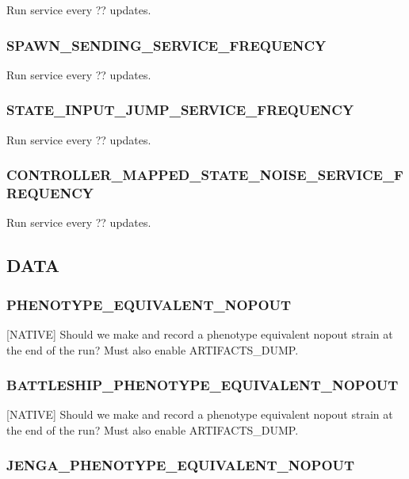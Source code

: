 
Run service every ?? updates.

\subsubsection{SPAWN\_SENDING\_SERVICE\_FREQUENCY}


Run service every ?? updates.

\subsubsection{STATE\_INPUT\_JUMP\_SERVICE\_FREQUENCY}


Run service every ?? updates.

\subsubsection{CONTROLLER\_MAPPED\_STATE\_NOISE\_SERVICE\_FREQUENCY}


Run service every ?? updates.

\subsection{DATA}

\subsubsection{PHENOTYPE\_EQUIVALENT\_NOPOUT}


[NATIVE] Should we make and record a phenotype equivalent nopout strain at the end of the run? Must also enable ARTIFACTS\_DUMP.

\subsubsection{BATTLESHIP\_PHENOTYPE\_EQUIVALENT\_NOPOUT}


[NATIVE] Should we make and record a phenotype equivalent nopout strain at the end of the run? Must also enable ARTIFACTS\_DUMP.

\subsubsection{JENGA\_PHENOTYPE\_EQUIVALENT\_NOPOUT}

